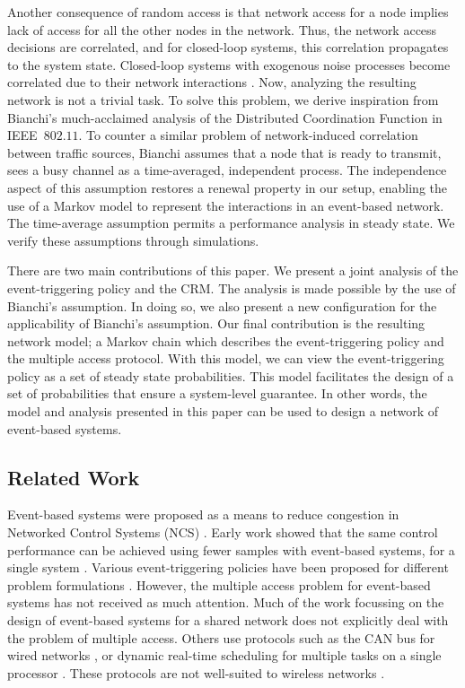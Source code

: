 \documentclass[journal]{IEEEtran}
\begin{document}
Another consequence of random access is that network access for a node implies lack of access for all the other nodes in the network. Thus, the network access decisions are correlated, and for closed-loop systems, this correlation propagates to the system state. Closed-loop systems with exogenous noise processes become correlated due to their network interactions \cite{Cervin2008,Rabi2009}. Now, analyzing the resulting network is not a trivial task. To solve this problem, we derive inspiration from Bianchi's much-acclaimed analysis of the Distributed Coordination Function \cite{Bianchi2000} in IEEE~$802.11$. To counter a similar problem of network-induced correlation between traffic sources, Bianchi assumes that a node that is ready to transmit, sees a busy channel as a time-averaged, independent process. The independence aspect of this assumption restores a renewal property in our setup, enabling the use of a Markov model to represent the interactions in an event-based network. The time-average assumption permits a performance analysis in steady state. We verify these assumptions through simulations.

There are two main contributions of this paper. We present a joint analysis of the event-triggering policy and the CRM. The analysis is made possible by the use of Bianchi's assumption. In doing so, we also present a new configuration for the applicability of Bianchi's assumption. Our final contribution is the resulting network model; a Markov chain which describes the event-triggering policy and the multiple access protocol. With this model, we can view the event-triggering policy as a set of steady state probabilities. This model facilitates the design of a set of probabilities that ensure a system-level guarantee. In other words, the model and analysis presented in this paper can be used to design a network of event-based systems.

\subsection{Related Work}
Event-based systems were proposed as a means to reduce congestion in Networked Control Systems (NCS) \cite{Astrom1999,Yook2002,Otanez2002}. Early work showed that the same control performance can be achieved using fewer samples with event-based systems, for a single system \cite{Tomovic1966,Astrom1999}. Various event-triggering policies have been proposed for different problem formulations \cite{Rabi2006,Tabuada2007,Heemels2008,Henningsson2008}. However, the multiple access problem for event-based systems has not received as much attention. Much of the work focussing on the design of event-based systems for a shared network \cite{Wang2011,Molin2012} does not explicitly deal with the problem of multiple access. Others use protocols such as the CAN bus for wired networks \cite{Anta2009a}, or dynamic real-time scheduling for multiple tasks on a single processor \cite{Tabuada2007}. These protocols are not well-suited to wireless networks \cite{Akyildiz1999,Gummalla2000}.
\end{document}
